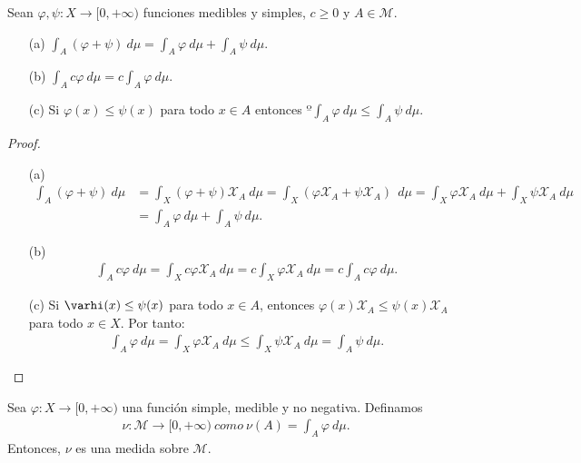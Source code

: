 \begin{prop}
Sean $\varphi, \psi: X \longrightarrow [0,+\infty)$ funciones medibles y simples, $c \ge 0$ y $A \in \mathcal{M}$.
\begin{enumerate}
    \item[(a)] $\int_{A}{(\varphi + \psi) \ d\mu} = \int_{A}{\varphi \ d\mu} + \int_{A}{\psi \ d\mu}$.
    \item[(b)] $\int_{A}{c\varphi \ d\mu} = c\int_{A}{\varphi \ d\mu}$.
    \item[(c)] Si $\varphi(x) \leq \psi(x)$ para todo $x \in A$ entonces $º\int_{A}{\varphi \ d\mu} \leq \int_{A}{\psi \ d\mu}$.
\end{enumerate}
\end{prop}

\begin{proof}
\begin{enumerate}
    \item[(a)]
    \begin{align*}
        \int_{A}{(\varphi + \psi) \ d\mu} &= \int_{X}{(\varphi + \psi)\mathcal{X}_{A} \ d\mu} = \int_{X}{(\varphi \mathcal{X}_{A} + \psi \mathcal{X}_{A})\ \ d\mu} =  \int_{X}{\varphi \mathcal{X}_{A} \ d\mu} + \int_{X}{\psi \mathcal{X}_{A} \ d\mu}\\
        &= \int_{A}{\varphi \ d\mu} + \int_{A}{\psi \ d\mu}.
    \end{align*}
    \item[(b)]
    \begin{align*}
        \int_{A}{c\varphi \ d\mu} = \int_{X}{c\varphi \mathcal{X}_{A} \ d\mu} = c\int_{X}{\varphi \mathcal{X}_{A} \ d\mu} = c\int_{A}{c\varphi \ d\mu}.
    \end{align*}
    \item[(c)] Si $\varhi(x) \leq \psi(x)$ para todo $x \in A$, entonces $\varphi(x) \mathcal{X}_{A} \leq \psi(x) \mathcal{X}_{A}$ para todo $x \in X$. Por tanto:
    \begin{align*}
        \int_{A}{\varphi \ d\mu} = \int_{X}{\varphi \mathcal{X}_A \ d\mu} \leq \int_{X}{\psi \mathcal{X}_A \ d\mu} = \int_{A}{\psi \ d\mu}.
    \end{align*}
\end{enumerate}
\end{proof}

\begin{prop}
Sea $\varphi: X \longrightarrow [0, +\infty)$ una función simple, medible y no negativa. Definamos
\begin{align*}
    \nu: \mathcal{M} \longrightarrow [0,+\infty) \ como \ \nu(A) = \int_{A}{\varphi \ d\mu}.
\end{align*}
Entonces, $\nu$ es una medida sobre $\mathcal{M}$.
\end{prop}

